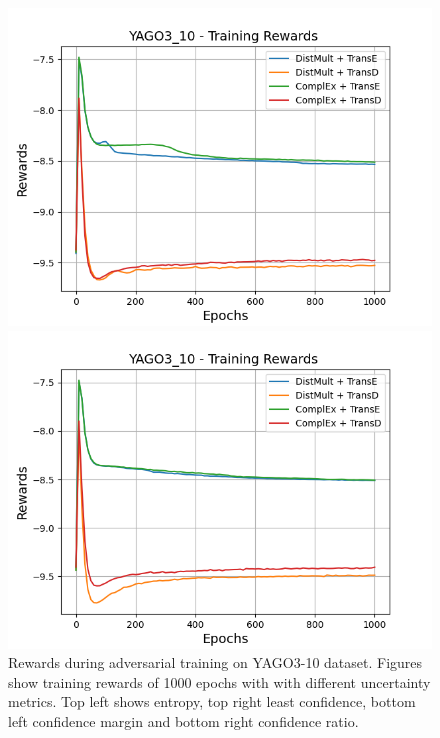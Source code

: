 \begin{figure}[H]
    \begin{minipage}{.5\textwidth}
      \centering
      \includegraphics[width=0.9\linewidth]{figures/results/gan_train/not_pretrained/uncertainty/max_distribution/confidence_margin/yago3_10/uncertainty_yago3_10_rew.png}
    \end{minipage}%
    \begin{minipage}{.5\textwidth}
      \centering
      \includegraphics[width=0.9\linewidth]{figures/results/gan_train/not_pretrained/uncertainty/max_distribution/confidence_ratio/yago3_10/uncertainty_yago3_10_rew.png}
    \end{minipage}%
    \caption{Rewards during adversarial training on \textsc{YAGO3-10} dataset. 
    Figures show training rewards of 1000 epochs with \ussoftmax with different uncertainty metrics.
    Top left shows entropy, top right least confidence, 
    bottom left confidence margin and bottom right confidence ratio.}
    \label{fig:advtrain_metrics_yago3_10_rew}
\end{figure}